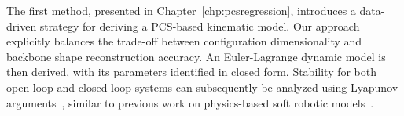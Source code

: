 The first method, presented in Chapter~\ref{chp:pcsregression}, introduces a data-driven strategy for deriving a \gls{PCS}-based kinematic model. Our approach explicitly balances the trade-off between configuration dimensionality and backbone shape reconstruction accuracy. An Euler-Lagrange dynamic model is then derived, with its parameters identified in closed form. Stability for both open-loop and closed-loop systems can subsequently be analyzed using Lyapunov arguments~\citep{khalil2002nonlinear}, similar to previous work on physics-based soft robotic models~\citep{della2023model}.


